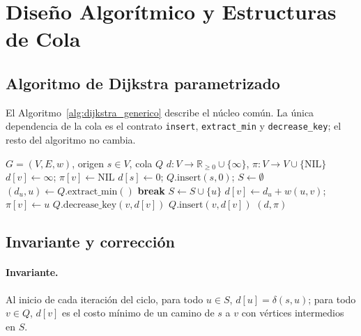 \section{Diseño Algorítmico y Estructuras de Cola}
\label{sec:diseno_algoritmico}

\subsection{Algoritmo de Dijkstra parametrizado}
El Algoritmo~\ref{alg:dijkstra_generico} describe el núcleo común. La única dependencia de la cola es el contrato \texttt{insert}, \texttt{extract\_min} y \texttt{decrease\_key}; el resto del algoritmo no cambia.

\begin{algorithm}[H]
\caption{Dijkstra con cola de prioridad parametrizada}
\label{alg:dijkstra_generico}
\begin{algorithmic}[1]
\REQUIRE $G=(V,E,w)$, origen $s\in V$, cola $Q$
\ENSURE $d:V\to\mathbb{R}_{\ge0}\cup\{\infty\}$, $\pi:V\to V\cup\{\text{NIL}\}$
    \STATE $d[v]\leftarrow\infty$; $\pi[v]\leftarrow\text{NIL}$
\ENDFOR
\STATE $d[s]\leftarrow 0$; $Q.\text{insert}(s,0)$; $S\leftarrow\emptyset$
    \STATE $(d_u,u)\leftarrow Q.\text{extract\_min}()$
        \STATE \textbf{break}
    \ENDIF
    \STATE $S\leftarrow S\cup\{u\}$
            \STATE $d[v]\leftarrow d_u+w(u,v)$; $\pi[v]\leftarrow u$
                \STATE $Q.\text{decrease\_key}(v,d[v])$
            \ELSE
                \STATE $Q.\text{insert}(v,d[v])$
            \ENDIF
        \ENDIF
    \ENDFOR
\ENDWHILE
\RETURN $(d,\pi)$
\end{algorithmic}
\end{algorithm}

\subsection{Invariante y corrección}
\paragraph{Invariante.} Al inicio de cada iteración del ciclo, para todo $u\in S$, $d[u]=\delta(s,u)$; para todo $v\in Q$, $d[v]$ es el costo mínimo de un camino de $s$ a $v$ con vértices intermedios en $S$.

